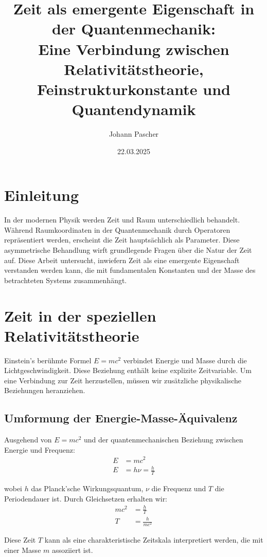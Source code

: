 \documentclass{article}
\title{Zeit als emergente Eigenschaft in der Quantenmechanik: \\Eine Verbindung zwischen Relativitätstheorie, Feinstrukturkonstante und Quantendynamik}
\author{Johann Pascher}
\date{22.03.2025}
\begin{document}
	
	\maketitle
		
	\section{Einleitung}
	
	In der modernen Physik werden Zeit und Raum unterschiedlich behandelt. Während Raumkoordinaten in der Quantenmechanik durch Operatoren repräsentiert werden, erscheint die Zeit hauptsächlich als Parameter. Diese asymmetrische Behandlung wirft grundlegende Fragen über die Natur der Zeit auf. Diese Arbeit untersucht, inwiefern Zeit als eine emergente Eigenschaft verstanden werden kann, die mit fundamentalen Konstanten und der Masse des betrachteten Systems zusammenhängt.
	
	\tableofcontents
	\section{Zeit in der speziellen Relativitätstheorie}
	
	Einstein's berühmte Formel $E = mc^2$ verbindet Energie und Masse durch die Lichtgeschwindigkeit. Diese Beziehung enthält keine explizite Zeitvariable. Um eine Verbindung zur Zeit herzustellen, müssen wir zusätzliche physikalische Beziehungen heranziehen.
	
	\subsection{Umformung der Energie-Masse-Äquivalenz}
	
	Ausgehend von $E = mc^2$ und der quantenmechanischen Beziehung zwischen Energie und Frequenz:
	\begin{align}
		E &= mc^2 \\
		E &= h\nu = \frac{h}{T}
	\end{align}
	
	wobei $h$ das Planck’sche Wirkungsquantum, $\nu$ die Frequenz und $T$ die Periodendauer ist. Durch Gleichsetzen erhalten wir:
	\begin{align}
		mc^2 &= \frac{h}{T} \\
		T &= \frac{h}{mc^2}
	\end{align}
	
	Diese Zeit $T$ kann als eine charakteristische Zeitskala interpretiert werden, die mit einer Masse $m$ assoziiert ist.
	
\end{document}

